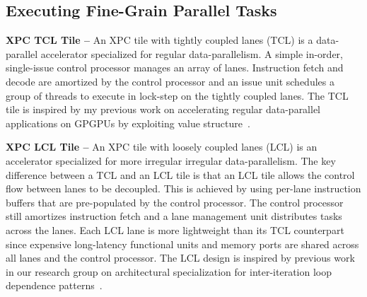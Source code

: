 
\subsection{Executing Fine-Grain Parallel Tasks}


\textbf{XPC TCL Tile --} An XPC tile with tightly coupled lanes (TCL) is
a data-parallel accelerator specialized for regular data-parallelism. A
simple in-order, single-issue control processor manages an array of
lanes. Instruction fetch and decode are amortized by the control
processor and an issue unit schedules a group of threads to execute in
lock-step on the tightly coupled lanes.
The TCL tile is inspired by my previous work on accelerating
regular data-parallel applications on GPGPUs by exploiting value
structure~\cite{kim-simt-vstruct-isca2013}.


\textbf{XPC LCL Tile --} An XPC tile with loosely coupled lanes (LCL) is
an accelerator specialized for more irregular irregular data-parallelism.
The key difference between a TCL and an LCL tile is that an LCL tile
allows the control flow between lanes to be decoupled. This is achieved
by using per-lane instruction buffers that are pre-populated by the
control processor. The control processor still amortizes instruction
fetch and a lane management unit distributes tasks across the lanes. Each
LCL lane is more lightweight than its TCL counterpart since expensive
long-latency functional units and memory ports are shared across all
lanes and the control processor.
The LCL design is inspired by previous work in our research group on
architectural specialization for inter-iteration loop dependence
patterns~\cite{srinath-xloops-micro2014}.

